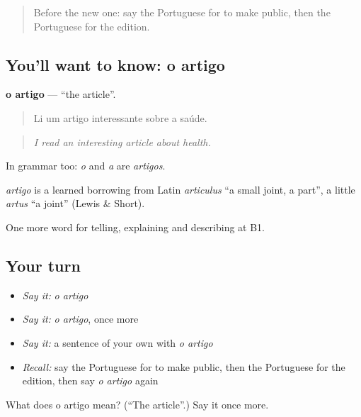 \label{lesson:PT-C280-artigo}



\begin{quote}
Before the new one: say the Portuguese for to make public, then the Portuguese for the edition.
\end{quote}

\subsection*{You'll want to know: o artigo}
\textbf{o artigo} — \textquotedblleft{}the article\textquotedblright{}.

\begin{quote}
Li um artigo interessante sobre a saúde.
\end{quote}

\begin{quote}
\emph{I read an interesting article about health.}
\end{quote}

In grammar too: \emph{o} and \emph{a} are \emph{artigos}.

\begin{cousinweb}
\emph{artigo} is a learned borrowing from Latin \emph{articulus} \textquotedblleft{}a small joint, a part\textquotedblright{}, a little \emph{artus} \textquotedblleft{}a joint\textquotedblright{} (Lewis \& Short).
\end{cousinweb}

\begin{grammarlens}[title={What you've built}]
One more word for telling, explaining and describing at B1.
\end{grammarlens}

\subsection*{Your turn}
\begin{itemize}
\raggedright
  \item \emph{Say it:} \emph{o artigo}
  \item \emph{Say it:} \emph{o artigo}, once more
  \item \emph{Say it:} a sentence of your own with \emph{o artigo}
  \item \emph{Recall:} say the Portuguese for to make public, then the Portuguese for the edition, then say \emph{o artigo} again
\end{itemize}

\begin{tcolorbox}[breakable,colback=teal!4,colframe=teal!35!black,title={Before you move on}]
What does o artigo mean? (\textquotedblleft{}The article\textquotedblright{}.) Say it once more.
\end{tcolorbox}
